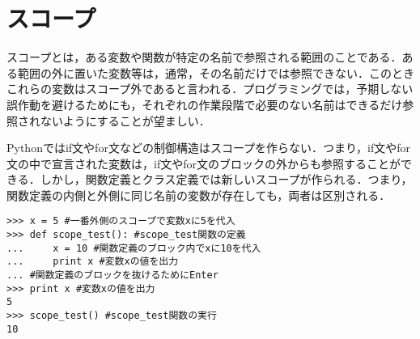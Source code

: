 \section{スコープ}
スコープとは，ある変数や関数が特定の名前で参照される範囲のことである．ある範囲の外に置いた変数等は，通常，その名前だけでは参照できない．このときこれらの変数はスコープ外であると言われる．プログラミングでは，予期しない誤作動を避けるためにも，それぞれの作業段階で必要のない名前はできるだけ参照されないようにすることが望ましい．


Pythonではif文やfor文などの制御構造はスコープを作らない．つまり，if文やfor文の中で宣言された変数は，if文やfor文のブロックの外からも参照することができる．しかし，関数定義とクラス定義では新しいスコープが作られる．つまり，関数定義の内側と外側に同じ名前の変数が存在しても，両者は区別される．


\begin{lstlisting}[caption=スコープ,label=scope]
>>> x = 5 #一番外側のスコープで変数xに5を代入
>>> def scope_test(): #scope_test関数の定義
...     x = 10 #関数定義のブロック内でxに10を代入
...     print x #変数xの値を出力
... #関数定義のブロックを抜けるためにEnter
>>> print x #変数xの値を出力
5
>>> scope_test() #scope_test関数の実行
10
\end{lstlisting}